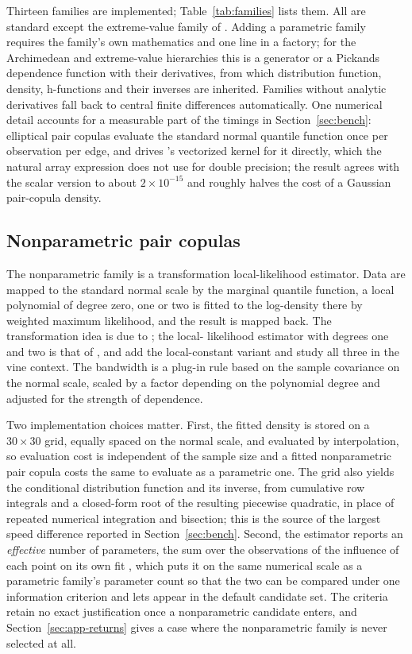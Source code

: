 \documentclass[article]{jss}
\begin{document}
Thirteen families are implemented; Table~\ref{tab:families} lists them.  All
are standard \citep{joe2014} except the extreme-value family of
\citet{tawn1988}.  Adding a parametric family requires the family's own
mathematics and one line in a factory; for the Archimedean and extreme-value
hierarchies this is a generator or a Pickands dependence function with their
derivatives, from which distribution function, density, h-functions and their
inverses are inherited.  Families without analytic derivatives fall back to
central finite differences automatically.  One numerical detail accounts for
a measurable part of the timings in Section~\ref{sec:bench}: elliptical pair
copulas evaluate the standard normal quantile function once per observation
per edge, and  drives 's vectorized kernel for it
directly, which the natural array expression does not use for double
precision; the result agrees with the scalar version to about
$2 \times 10^{-15}$ and roughly halves the cost of a Gaussian pair-copula
density.

\subsection{Nonparametric pair copulas}\label{sec:tll-engine}

The nonparametric family  is a transformation local-likelihood
estimator.  Data are mapped to the standard normal scale by the marginal
quantile function, a local polynomial of degree zero, one or two is fitted to
the log-density there by weighted maximum likelihood, and the result is mapped
back.  The transformation idea is due to \citet{geenens2014}; the local-%
likelihood estimator with degrees one and two is that of \citet{geenens2017},
and \citet{nagler2017} add the local-constant variant and study all three in
the vine context.  The bandwidth is a plug-in rule based on the sample
covariance on the normal scale, scaled by a factor depending on the polynomial
degree and adjusted for the strength of dependence.

Two implementation choices matter.  First, the fitted density is stored on a
$30 \times 30$ grid, equally spaced on the normal scale, and evaluated by
interpolation, so evaluation cost is independent of the sample size and a
fitted nonparametric pair copula costs the same to evaluate as a parametric
one.  The grid also yields the conditional distribution function and its
inverse, from cumulative row integrals and a closed-form root of the
resulting piecewise quadratic, in place of repeated numerical integration and
bisection; this is the source of the largest speed difference reported in
Section~\ref{sec:bench}.  Second, the estimator reports an \emph{effective}
number of parameters, the sum over the observations of the influence of each
point on its own fit \citep[\S5.3.2]{loader1999}, which puts it on the same
numerical scale as a parametric family's parameter count so that the two can
be compared under one information criterion \citep{nagler2017} and lets
 appear in the default candidate set.  The criteria retain no
exact justification once a nonparametric candidate enters, and
Section~\ref{sec:app-returns} gives a case where the nonparametric family is
never selected at all.
\end{document}

